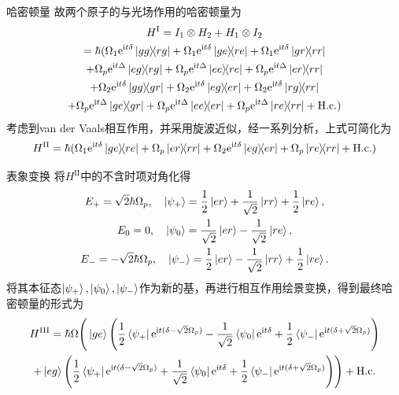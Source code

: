 \documentclass[10pt,aspectratio=43]{beamer}
\begin{document}
\begin{frame}{哈密顿量}
故两个原子的与光场作用的哈密顿量为
\begin{multline}
H^\mathrm{I}=I_1\otimes H_2+H_1\otimes I_2\\
=\hbar(\Omega_1\mathrm{e}^{\mathrm{i}t\delta}\ketbra{gg}{rg}
+\Omega_1\mathrm{e}^{\mathrm{i}t\delta}\ketbra{ge}{re}
+\Omega_1\mathrm{e}^{\mathrm{i}t\delta}\ketbra{gr}{rr}\\
+\Omega_p\mathrm{e}^{\mathrm{i}t\Delta}\ketbra{eg}{rg}
+\Omega_p\mathrm{e}^{\mathrm{i}t\Delta}\ketbra{ee}{re}
+\Omega_p\mathrm{e}^{\mathrm{i}t\Delta}\ketbra{er}{rr}\\
+\Omega_2\mathrm{e}^{\mathrm{i}t\delta}\ketbra{gg}{gr}
+\Omega_2\mathrm{e}^{\mathrm{i}t\delta}\ketbra{eg}{er}
+\Omega_2\mathrm{e}^{\mathrm{i}t\delta}\ketbra{rg}{rr}\\
+\Omega_p\mathrm{e}^{\mathrm{i}t\Delta}\ketbra{ge}{gr}
+\Omega_p\mathrm{e}^{\mathrm{i}t\Delta}\ketbra{ee}{er}
+\Omega_p\mathrm{e}^{\mathrm{i}t\Delta}\ketbra{re}{rr}
+\mathrm{H.c.})
\end{multline}
考虑到van der Vaals相互作用，并采用旋波近似，经一系列分析，上式可简化为
\begin{equation}
H^{\mathrm{II}}=\hbar(\Omega_1\mathrm{e}^{\mathrm{i}t \delta}\ketbra{ge}{re}
+\Omega_p\ketbra{er}{rr}
+\Omega_2\mathrm{e}^{\mathrm{i}t \delta}\ketbra{eg}{er}
+\Omega_p\ketbra{re}{rr}+\mathrm{H.c.})
\end{equation}

\end{frame}
\begin{frame}{表象变换}
将$ H^{\mathrm{II}} $中的不含时项对角化得
{\small\begin{equation}
\begin{gathered}
E_+=\sqrt{2}\hbar\Omega_p,\quad\ket{\psi_+}=\frac{1}{2}\ket{er}+\frac{1}{\sqrt{2}}\ket{rr}+\frac{1}{2}\ket{re},\\
E_0=0,\quad\ket{\psi_0}=\frac{1}{\sqrt{2}}\ket{er}-\frac{1}{\sqrt{2}}\ket{re},\\
E_-=-\sqrt{2}\hbar\Omega_p,\quad\ket{\psi_-}=\frac{1}{2}\ket{er}-\frac{1}{\sqrt{2}}\ket{rr}+\frac{1}{2}\ket{re}.
\end{gathered}
\end{equation}}
将其本征态$ \ket{\psi_+},\ket{\psi_0},\ket{\psi_-} $作为新的基，再进行相互作用绘景变换，得到最终哈密顿量的形式为
{\small\begin{multline}
H^{\mathrm{III}}=\hbar\Omega\Bigg(\ket{ge}\Bigg(\frac{1}{2}\bra{\psi_+}\mathrm{e}^{\mathrm{i}t(\delta-\sqrt{2}\Omega_p)}-\frac{1}{\sqrt{2}}\bra{\psi_0}\mathrm{e}^{\mathrm{i}t \delta}+\frac{1}{2}\bra{\psi_-}\mathrm{e}^{\mathrm{i}t (\delta+\sqrt{2}\Omega_p)}\Bigg)\\
+\ket{eg}\Bigg(\frac{1}{2}\bra{\psi_+}\mathrm{e}^{\mathrm{i}t(\delta-\sqrt{2}\Omega_p)}+\frac{1}{\sqrt{2}}\bra{\psi_0}\mathrm{e}^{\mathrm{i}t \delta}+\frac{1}{2}\bra{\psi_-}\mathrm{e}^{\mathrm{i}t (\delta+\sqrt{2}\Omega_p)}\Bigg)\Bigg)+\mathrm{H.c.}
\end{multline}}
\end{frame}
\end{document}
